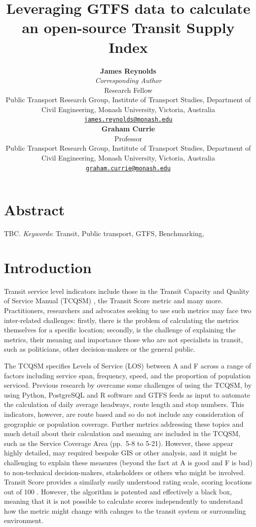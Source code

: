 \documentclass[numbered]{trbunofficial}
\title{Leveraging GTFS data to calculate an open-source Transit Supply
Index}
\author{%
    \textbf{James Reynolds}\\\textit{Corresponding Author}\\
  Research Fellow\\
  Public Transport Research Group, Institute of Transport Studies,
Department of Civil Engineering, Monash University, Victoria,
Australia\\
  \href{mailto:james.reynolds@monash.edu}{\nolinkurl{james.reynolds@monash.edu}}\\
  \hfill\break
    \textbf{Graham Currie}\\
  Professor\\
  Public Transport Research Group, Institute of Transport Studies,
Department of Civil Engineering, Monash University, Victoria,
Australia\\
  \href{mailto:graham.currie@monash.edu}{\nolinkurl{graham.currie@monash.edu}}\\
  \hfill\break
  }
\begin{document}
\maketitle


\section{Abstract}
TBC.
\hfill\break%
\hfill\break%
\noindent\textit{Keywords}:  Transit, Public
transport, GTFS, Benchmarking,  
\newpage

\hypertarget{introduction}{%
\section{Introduction}\label{introduction}}

Transit service level indicators include those in the Transit Capacity
and Quality of Service Manual (TCQSM) \citep{TCQSM:2013}, the Transit
Score metric and many more. Practitioners, researchers and advocates
seeking to use such metrics may face two inter-related challenges:
firstly, there is the problem of calculating the metrics themselves for
a specific location; secondly, is the challenge of explaining the
metrics, their meaning and importance those who are not specialists in
transit, such as politicians, other decision-makers or the general
public.

The TCQSM specifies Levels of Service (LOS) between A and F across a
range of factors including service span, frequency, speed, and the
proportion of population serviced. Previous research by
\citet{Wong:2013aa} overcame some challenges of using the TCQSM, by
using Python, PostgreSQL and R software and GTFS feeds as input to
automate the calculation of daily average headways, route length and
stop numbers. This indicators, however, are route based and so do not
include any consideration of geographic or population coverage. Further
metrics addressing these topics and much detail about their calculation
and meaning are included in the TCQSM, such as the Service Coverage Area
(pp.~5-8 to 5-21). However, these appear highly detailed, may required
bespoke GIS or other analysis, and it might be challenging to explain
these measures (beyond the fact at A is good and F is bad) to
non-technical decision-makers, stakeholders or others who might be
involved. Transit Score provides a similarly easily understood rating
scale, scoring locations out of 100 \citep{WalkScore:2023tg}. However,
the algorithm is patented and effectively a black box, meaning that it
is not possible to calculate scores independently to understand how the
metric might change with cahnges to the transit system or surrounding
environment.
\end{document}
